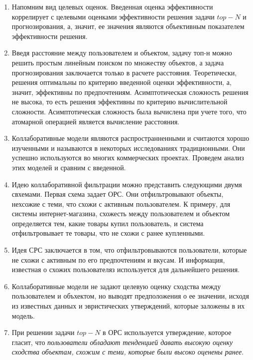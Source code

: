 \documentclass[a4paper,14pt]{proc}
\begin{document}
{\begin{enumerate}
\item Напомним вид целевых оценок.
Введенная оценка эффективности коррелирует с целевыми оценками эффективности решения задачи $top-N$ и прогнозирования,
а, значит, ее значения являются объективным показателем эффективности решения. 

\item Введя расстояние между пользователем и объектом, задачу топ-н можно решить простым линейным поиском
по множеству объектов, а задача прогнозирования заключается только в расчете расстояния. Теоретически, решения
оптимальны по критерию введенной оценки эффективности, а, значит, эффективны по предпочтениям. Асимптотическая 
сложность решения не высока, то есть решения эффективны по критерию вычислительной сложности. Асимптотическая сложность
была вычислена при учете того, что атомарной операцией является вычисление расстояния.
 
%
%
% 
\item Коллаборативные модели являются
распространненными и считаются хорошо изученными и называются в некоторых исследованиях традиционными.
Они успешно используются во многих коммерческих проектах. Проведем анализ этих моделей и сравним с введенной.

\item Идею коллаборативной фильтрации можно представить следующими двумя свхемами. Первая схема задает ОРС. 
Они отфильтровывают объекты, нехсожие с теми, что схожи с активным пользователем.
К примеру, для  системы интернет-магазина, схожесть между пользователем и объектом
определяется тем, какие товары купил пользователь, и система отфильтровывает те товары, что не схожи с ранее купленными.

\item Идея СРС заключается в том, что отфильтровываются пользователи, которые не схожи с активным по его предпочтениям и вкусам. 
И информация, известная о схожих пользователяз используется для дальнейшего решения.

\item Коллаборативные модели не задают целевую оценку сходства между пользователем и объхектом, 
но выводят предположения о ее значении, исходя из известных данных и эвристических утверждений, 
которые заложены в их модель.

\item При решении задачи $top-N$ в ОРС используется утверждение, которое гласит, что 
{\it пользователи обладают тенденцией давать высокую оценку сходства объектам, схожим с теми, которые были высоко оценены ранее}. 


\end{enumerate}}
\end{document}
